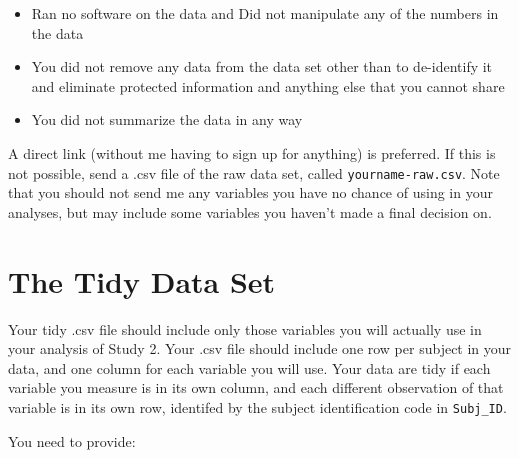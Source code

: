 \documentclass[]{book}
\providecommand{\tightlist}{%
  \setlength{\itemsep}{0pt}\setlength{\parskip}{0pt}}
\theoremstyle{definition}
\theoremstyle{definition}
\theoremstyle{definition}
\theoremstyle{remark}
\begin{document}
\begin{itemize}
\tightlist
\item
  Ran no software on the data and Did not manipulate any of the numbers
  in the data
\item
  You did not remove any data from the data set other than to
  de-identify it and eliminate protected information and anything else
  that you cannot share
\item
  You did not summarize the data in any way
\end{itemize}

A direct link (without me having to sign up for anything) is preferred.
If this is not possible, send a .csv file of the raw data set, called
\texttt{yourname-raw.csv}. Note that you should not send me any
variables you have no chance of using in your analyses, but may include
some variables you haven't made a final decision on.

\hypertarget{the-tidy-data-set}{%
\section{The Tidy Data Set}\label{the-tidy-data-set}}

Your tidy .csv file should include only those variables you will
actually use in your analysis of Study 2. Your .csv file should include
one row per subject in your data, and one column for each variable you
will use. Your data are tidy if each variable you measure is in its own
column, and each different observation of that variable is in its own
row, identifed by the subject identification code in \texttt{Subj\_ID}.

You need to provide:
\end{document}

